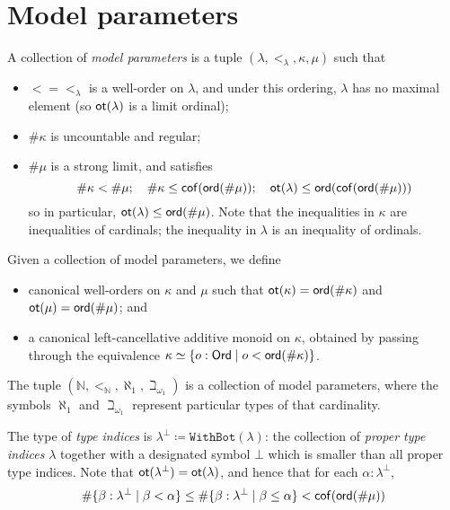 \section{Model parameters}
\begin{definition}
  \label{def:Params}
  A collection of \emph{model parameters} is a tuple \( (\lambda, {<_\lambda}, \kappa, \mu) \) such that
  \begin{itemize}
    \item \( {<} = {<_\lambda} \) is a well-order on \( \lambda \), and under this ordering, \( \lambda \) has no maximal element (so \( \operatorname{\mathsf{ot}}(\lambda) \) is a limit ordinal);
    \item \( \#\kappa \) is uncountable and regular;
    \item \( \#\mu \) is a strong limit, and satisfies
    \[ \#\kappa < \#\mu;\quad \#\kappa \leq \operatorname{\mathsf{cof}}(\operatorname{\mathsf{ord}}(\#\mu));\quad \operatorname{\mathsf{ot}}(\lambda) \leq \operatorname{\mathsf{ord}}(\operatorname{\mathsf{cof}}(\operatorname{\mathsf{ord}}(\#\mu))) \]
    so in particular, \( \operatorname{\mathsf{ot}}(\lambda) \leq \operatorname{\mathsf{ord}}(\#\mu) \).
    Note that the inequalities in \( \kappa \) are inequalities of cardinals; the inequality in \( \lambda \) is an inequality of ordinals.
  \end{itemize}
  Given a collection of model parameters, we define
  \begin{itemize}
    \item canonical well-orders on \( \kappa \) and \( \mu \) such that \( \operatorname{\mathsf{ot}}(\kappa) = \operatorname{\mathsf{ord}}(\#\kappa) \) and \( \operatorname{\mathsf{ot}}(\mu) = \operatorname{\mathsf{ord}}(\#\mu) \); and
    \item a canonical left-cancellative additive monoid on \( \kappa \), obtained by passing through the equivalence \( \kappa \simeq \{ o : \mathsf{Ord} \mid o < \operatorname{\mathsf{ord}}(\#\kappa) \} \).
  \end{itemize}
\end{definition}
\begin{proposition}
  \label{prop:Params.minimal}
  The tuple \( (\mathbb N, {<_{\mathbb N}}, \aleph_1, \beth_{\omega_1}) \) is a collection of model parameters, where the symbols \( \aleph_1 \) and \( \beth_{\omega_1} \) represent particular types of that cardinality.
\end{proposition}
\begin{definition}
  \label{def:TypeIndex}
  The type of \emph{type indices} is \( \lambda^\bot \coloneq \texttt{WithBot}(\lambda) \): the collection of \emph{proper type indices} \( \lambda \) together with a designated symbol \( \bot \) which is smaller than all proper type indices.
  Note that \( \operatorname{\mathsf{ot}}(\lambda^\bot) = \operatorname{\mathsf{ot}}(\lambda) \), and hence that for each \( \alpha : \lambda^\bot \),
  \[ \#\{ \beta : \lambda^\bot \mid \beta < \alpha \} \leq \#\{ \beta : \lambda^\bot \mid \beta \leq \alpha \} < \operatorname{\mathsf{cof}}(\operatorname{\mathsf{ord}}(\#\mu)) \]
\end{definition}
